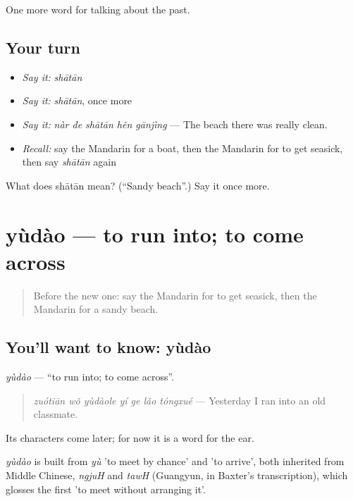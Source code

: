 \begin{grammarlens}[title={What you've built}]
One more word for talking about the past.
\end{grammarlens}

\subsection*{Your turn}
\begin{itemize}
\raggedright
  \item \emph{Say it:} \emph{shātān}
  \item \emph{Say it:} \emph{shātān}, once more
  \item \emph{Say it:} \emph{nàr de shātān hěn gānjìng} — The beach there was really clean.
  \item \emph{Recall:} say the Mandarin for a boat, then the Mandarin for to get seasick, then say \emph{shātān} again
\end{itemize}

\begin{tcolorbox}[breakable,colback=teal!4,colframe=teal!35!black,title={Before you move on}]
What does shātān mean? (\textquotedblleft{}Sandy beach\textquotedblright{}.) Say it once more.
\end{tcolorbox}
\section[yùdào]{yùdào — to run into; to come across}

\label{lesson:ZH-C227-yudao}



\begin{quote}
Before the new one: say the Mandarin for to get seasick, then the Mandarin for a sandy beach.
\end{quote}

\subsection*{You'll want to know: yùdào}
\emph{yùdào} — \textquotedblleft{}to run into; to come across\textquotedblright{}.

\begin{quote}
\emph{zuótiān wǒ yùdàole yí ge lǎo tóngxué} — Yesterday I ran into an old classmate.
\end{quote}

Its characters come later; for now it is a word for the ear.

\begin{cousinweb}
\emph{yùdào} is built from \emph{yù} 'to meet by chance' and  'to arrive', both inherited from Middle Chinese, \emph{ngjuH} and \emph{tawH} (Guangyun, in Baxter's transcription), which glosses the first 'to meet without arranging it'.
\end{cousinweb}

